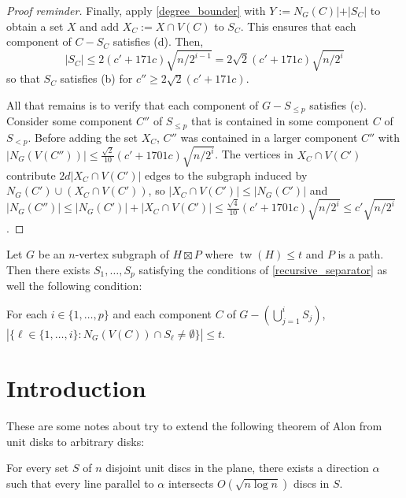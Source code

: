 \documentclass{patmorin}
\renewcommand{\ge}{\geqslant}
\renewcommand{\le}{\leqslant}
\DeclareMathOperator{\tw}{tw}
\begin{document}
\begin{proof}[Proof reminder]
  Finally, apply \cref{degree_bounder} with $Y:=N_G(C)|+|S_C|$ to obtain a set $X$ and add $X_C:=X\cap V(C)$ to $S_C$.  This ensures that each component of $C-S_C$ satisfies (d).  Then,
  \[
    |S_C| \le 2(c'+171c)\sqrt{n/2^{i-1}} = 2\sqrt{2}(c'+171c)\sqrt{n/2^{i}}
  \]
  so that $S_C$ satisfies (b) for $c''\ge 2\sqrt{2}(c'+171c)$.

  All that remains is to verify that each component of $G-S_{\le p}$ satisfies (c).  Consider some component $C''$ of $S_{\le p}$ that is contained in some component $C$ of $S_{<p}$.  Before adding the set $X_C$, $C''$ was contained in a larger component $C''$ with $|N_G(V(C''))|\le \tfrac{\sqrt{2}}{10}(c'+1701c)\sqrt{n/2^{i}}$.  The vertices in $X_C\cap V(C')$ contribute $2d|X_C\cap V(C')|$ edges to the subgraph induced by $N_G(C')\cup (X_C\cap V(C'))$, so $|X_C\cap V(C')|\le |N_G(C')|$ and $|N_G(C'')|\le |N_G(C')|+|X_C\cap V(C')| \le \tfrac{\sqrt{4}}{10}(c'+1701c)\sqrt{n/2^{i}} \le c'\sqrt{n/2^i}$.
\end{proof}


\begin{lem}
  Let $G$ be an $n$-vertex subgraph of $H\boxtimes P$ where $\tw(H)\le t$ and $P$ is a path.  Then there exists $S_1,\ldots,S_p$ satisfying the conditions of \cref{recursive_separator} as well the following condition:
  \begin{compactenum}[(a)]\setcounter{enumi}{4}
    \item For each $i\in\{1,\ldots,p\}$ and each component $C$ of $G-(\bigcup_{j=1}^i S_j)$, $|\{\ell\in\{1,\ldots,i\}:N_G(V(C))\cap S_\ell\neq\emptyset\}|\le t$.
  \end{compactenum}
\end{lem}







\section{Introduction}

These are some notes about try to extend the following theorem of Alon from unit disks to arbitrary disks:

\begin{thm}[Alon]\label{alon}
  For every set $S$ of $n$ disjoint unit discs in the plane, there exists a direction $\alpha$ such that every line parallel to $\alpha$ intersects $O(\sqrt{n\log n})$ discs in $S$.
\end{thm}
\end{document}
